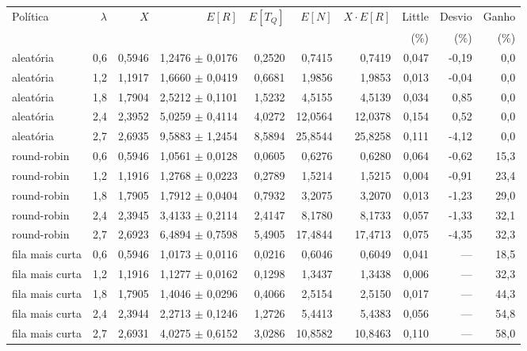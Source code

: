 \begin{tabular}{lrrrrrrrrr}
    \toprule
    Política & $\lambda$ & $X$ & $E[R]$ & $E[T_Q]$ & $E[N]$ & $X \cdot E[R]$ & Little & Desvio & Ganho \\
    & & & & & & & (\%) & (\%) & (\%) \\
    \midrule
    aleatória & 0,6 & 0,5946 & 1,2476 $\pm$ 0,0176 & 0,2520 & 0,7415 & 0,7419 & 0,047 & -0,19 & 0,0 \\
    aleatória & 1,2 & 1,1917 & 1,6660 $\pm$ 0,0419 & 0,6681 & 1,9856 & 1,9853 & 0,013 & -0,04 & 0,0 \\
    aleatória & 1,8 & 1,7904 & 2,5212 $\pm$ 0,1101 & 1,5232 & 4,5155 & 4,5139 & 0,034 & 0,85 & 0,0 \\
    aleatória & 2,4 & 2,3952 & 5,0259 $\pm$ 0,4114 & 4,0272 & 12,0564 & 12,0378 & 0,154 & 0,52 & 0,0 \\
    aleatória & 2,7 & 2,6935 & 9,5883 $\pm$ 1,2454 & 8,5894 & 25,8544 & 25,8258 & 0,111 & -4,12 & 0,0 \\
    round-robin & 0,6 & 0,5946 & 1,0561 $\pm$ 0,0128 & 0,0605 & 0,6276 & 0,6280 & 0,064 & -0,62 & 15,3 \\
    round-robin & 1,2 & 1,1916 & 1,2768 $\pm$ 0,0223 & 0,2789 & 1,5214 & 1,5215 & 0,004 & -0,91 & 23,4 \\
    round-robin & 1,8 & 1,7905 & 1,7912 $\pm$ 0,0404 & 0,7932 & 3,2075 & 3,2070 & 0,013 & -1,23 & 29,0 \\
    round-robin & 2,4 & 2,3945 & 3,4133 $\pm$ 0,2114 & 2,4147 & 8,1780 & 8,1733 & 0,057 & -1,33 & 32,1 \\
    round-robin & 2,7 & 2,6923 & 6,4894 $\pm$ 0,7598 & 5,4905 & 17,4844 & 17,4713 & 0,075 & -4,35 & 32,3 \\
    fila mais curta & 0,6 & 0,5946 & 1,0173 $\pm$ 0,0116 & 0,0216 & 0,6046 & 0,6049 & 0,041 & --- & 18,5 \\
    fila mais curta & 1,2 & 1,1916 & 1,1277 $\pm$ 0,0162 & 0,1298 & 1,3437 & 1,3438 & 0,006 & --- & 32,3 \\
    fila mais curta & 1,8 & 1,7905 & 1,4046 $\pm$ 0,0296 & 0,4066 & 2,5154 & 2,5150 & 0,017 & --- & 44,3 \\
    fila mais curta & 2,4 & 2,3944 & 2,2713 $\pm$ 0,1246 & 1,2726 & 5,4413 & 5,4383 & 0,056 & --- & 54,8 \\
    fila mais curta & 2,7 & 2,6931 & 4,0275 $\pm$ 0,6152 & 3,0286 & 10,8582 & 10,8463 & 0,110 & --- & 58,0 \\
    \bottomrule
\end{tabular}
